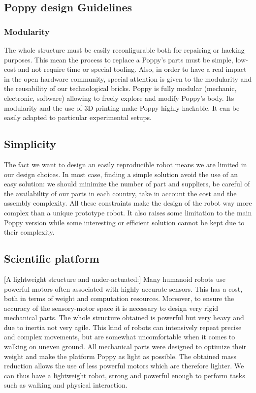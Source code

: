 \subsection{Poppy design Guidelines} %

\subsubsection{Modularity} %
\label{ssub:modularity}

The whole structure must be easily reconfigurable both for repairing or hacking purposes. This mean the process to replace a Poppy's parts must be simple, low-cost and not require time or special tooling. Also, in order to have a real impact in the open hardware community, special attention is given to the modularity and the reusability of our technological bricks.
Poppy is fully modular (mechanic, electronic, software) allowing to freely explore and modify Poppy's body.
Its modularity and the use of 3D printing make Poppy highly hackable. It can be easily adapted to particular experimental setups.

\subsection{Simplicity} %
The fact we want to design an easily reproducible robot means we are limited in our design choices. In most case, finding a simple solution avoid the use of an easy solution: we should minimize the number of part and suppliers, be careful of the availability of our parts in each country, take in account the cost and the assembly complexity. All these constraints make the design of the robot way more complex than a unique prototype robot. It also raises some limitation to the main Poppy version while some interesting or efficient solution cannot be kept due to their complexity.


\subsection{Scientific platform} %

[A lightweight structure and under-actuated:] Many humanoid robots use powerful motors often associated with highly accurate sensors. This has a cost, both in terms of weight and computation resources. Moreover, to ensure the accuracy of the sensory-motor space it is necessary to design very rigid mechanical parts. The whole structure obtained is powerful but very heavy and due to inertia not very agile. This kind of robots can intensively repeat precise and complex movements, but are somewhat uncomfortable when it comes to walking on uneven ground. All mechanical parts were designed to optimize their weight and make the platform Poppy as light as possible. The obtained mass reduction allows the use of less powerful motors which are therefore lighter. We can thus have a lightweight robot, strong and powerful enough to perform tasks such as walking and physical interaction.

